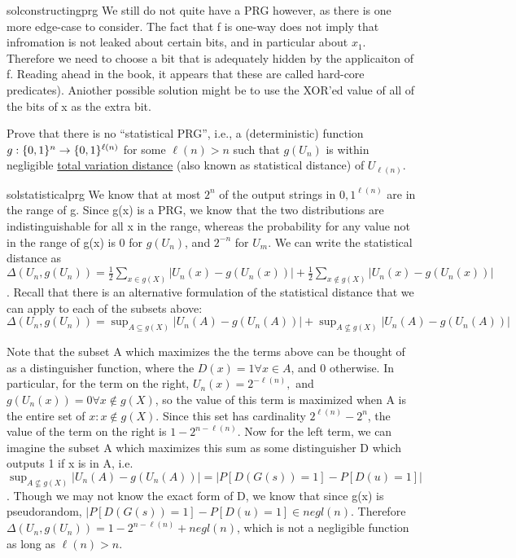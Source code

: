 \begin{questions}
\begin{mysolution}{solconstructingprg}
      We still do not quite have a PRG however, as there is one more edge-case to consider. The fact that f is one-way does not imply that infromation is not leaked about certain bits, and in particular about $x_1$. Therefore we need to choose a bit that is adequately hidden by the applicaiton of f. Reading ahead in the book, it appears that these are called hard-core predicates). Aniother possible solution might be to use the XOR'ed value of all of the bits of x as the extra bit.
    \end{mysolution}





  \question[2] 
	Prove that there is no ``statistical PRG'', i.e., a (deterministic) function $g:\{{0,1}\}^n \to \{{0,1}\}^{\ell(n)}$
	for some $\ell(n) > n$ such that $g(U_n)$ is within negligible \href{http://en.wikipedia.org/wiki/Total_variation_distance_of_probability_measures}{total variation distance} (also known as statistical distance) of $U_{\ell(n)}$.
    \begin{mysolution}{solstatisticalprg}
      We know that at most $2^{n}$ of the output strings in ${0,1}^{\ell(n)}$ are in the range of g. Since g(x) is a PRG, we know that the two distributions are indistinguishable for all x in the range, whereas the probability for any value not in the range of g(x) is 0 for $g(U_n)$, and $2^{-n}$ for $U_m$. We can write the statistical distance as
	$ \Delta(U_n, g(U_n)) =\frac{1}{2} \sum_{x \in g(X)} |U_n(x) - g(U_n(x))| + \frac{1}{2} \sum_{x \notin g(X)} |U_n(x) - g(U_n(x))|$.
	Recall that there is an alternative formulation of the statistical distance that we can apply to each of the subsets above:
       $ \Delta(U_n, g(U_n))
        =\sup_{A \subseteq g(X)} |U_n(A) - g(U_n(A))| 
        +\sup_{A \not \subseteq g(X)} |U_n(A) - g(U_n(A))|$
       
       Note that the subset A which maximizes the the terms above can be thought of as a distinguisher function, where the $D(x)=1 \forall x \in A$, and 0 otherwise. In particular, for the term on the right, $ U_n(x) = 2^{-\ell(n)}, $ and $g(U_n(x)) =0 \forall x \notin g(X)$,
        so the value of this term is maximized when A is the entire set of $x: x \notin g(X)$. 
        Since this set has cardinality $2^{\ell(n)} - 2^n$, the value of the term on the right is  $1-2^{n-\ell(n)}$.
         Now for the left term, we can imagine the subset A which maximizes this sum as some distinguisher D which outputs 1 if x is in A, i.e. $\sup_{A \not \subseteq g(X)} |U_n(A) - g(U_n(A))|  = |P[D(G(s))=1] - P[D(u)=1]|$ . 
        Though we may not know the exact form of D, we know that since g(x) is pseudorandom, $|P[D(G(s))=1] - P[D(u)=1] \in negl(n)$.
        Therefore $ \Delta(U_n, g(U_n)) 
        = 1-2^{n-\ell(n)} + negl(n)$, which is not a negligible function as long as $\ell(n) > n$.
      

\end{mysolution}
\end{questions}
